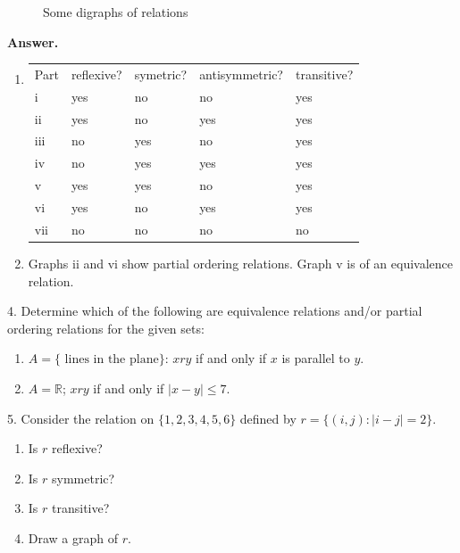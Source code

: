 \documentclass[10pt,]{book}
\theoremstyle{plain}
\theoremstyle{definition}
\theoremstyle{definition}
\theoremstyle{definition}
\theoremstyle{definition}
\begin{document}
\begin{exercisegroup}
\begin{figure}
\caption{Some digraphs of relations\label{fig-exercises-6-digraphs}}
\end{figure}
\par\smallskip
\par\smallskip
\noindent\textbf{Answer.}\hypertarget{answer-8}{}\quad
\leavevmode%
\begin{enumerate}[label=\roman*]
\item\hypertarget{li-48}{}\leavevmode%
\begin{table}
\centering
\begin{tabular}{lllll}
Part&reflexive?&symetric?&antisymmetric?&transitive?\tabularnewline[0pt]
i&yes&no&no&yes\tabularnewline[0pt]
ii&yes&no&yes&yes\tabularnewline[0pt]
iii&no&yes&no&yes\tabularnewline[0pt]
iv&no&yes&yes&yes\tabularnewline[0pt]
v&yes&yes&no&yes\tabularnewline[0pt]
vi&yes&no&yes&yes\tabularnewline[0pt]
vii&no&no&no&no
\end{tabular}
\end{table}
%
\item\hypertarget{li-49}{} Graphs ii and vi show partial ordering relations. Graph v is of an equivalence relation. %
\end{enumerate}
%
\item[4.]\hypertarget{exercise-16}{}Determine which of the following are equivalence relations and/or partial ordering relations for the given sets:%
\par
\leavevmode%
\begin{enumerate}[label=\alph*]
\item\hypertarget{li-50}{} \(A = \{\textrm{ lines in the plane}\}\): \(x r y\) if and only if \(x\) is parallel to \(y\).%
\item\hypertarget{li-51}{} \(A = \mathbb{R}\); \(x r y\) if and only if \(\lvert x -y \rvert \leq  7\).%
\end{enumerate}
%
\par\smallskip
\item[5.]\hypertarget{exercise-17}{}Consider the  relation on \(\{1, 2, 3, 4, 5, 6\}\) defined by  \(r = \{(i,j): \mid i - j\mid  = 2\}\).%
\par
\leavevmode%
\begin{enumerate}[label=\alph*]
\item\hypertarget{li-52}{} Is \(r\) reflexive?%
\item\hypertarget{li-53}{} Is \(r\) symmetric?%
\item\hypertarget{li-54}{} Is \(r\) transitive?%
\item\hypertarget{li-55}{} Draw a graph of \(r\).%

\end{enumerate}
\end{exercisegroup}
\end{document}
